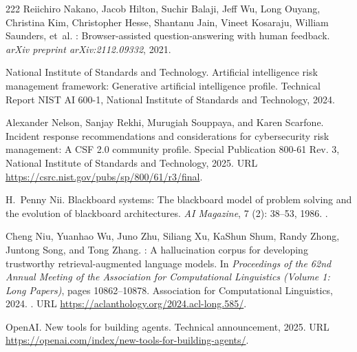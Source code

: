 \begin{thebibliography}{222}
Reiichiro Nakano, Jacob Hilton, Suchir Balaji, Jeff Wu, Long Ouyang, Christina
  Kim, Christopher Hesse, Shantanu Jain, Vineet Kosaraju, William Saunders,
  et~al.
: Browser-assisted question-answering with human feedback.
\newblock \emph{arXiv preprint arXiv:2112.09332}, 2021.

{National Institute of Standards and Technology}.
\newblock Artificial intelligence risk management framework: Generative
  artificial intelligence profile.
\newblock Technical Report NIST AI 600-1, National Institute of Standards and
  Technology, 2024.

Alexander Nelson, Sanjay Rekhi, Murugiah Souppaya, and Karen Scarfone.
\newblock Incident response recommendations and considerations for
  cybersecurity risk management: A {CSF} 2.0 community profile.
\newblock Special Publication 800-61 Rev. 3, National Institute of Standards
  and Technology, 2025.
\newblock URL \url{https://csrc.nist.gov/pubs/sp/800/61/r3/final}.

H.~Penny Nii.
\newblock Blackboard systems: The blackboard model of problem solving and the
  evolution of blackboard architectures.
\newblock \emph{AI Magazine}, 7 (2): 38--53, 1986.
\newblock {}.

Cheng Niu, Yuanhao Wu, Juno Zhu, Siliang Xu, KaShun Shum, Randy Zhong, Juntong
  Song, and Tong Zhang.
: A hallucination corpus for developing trustworthy
  retrieval-augmented language models.
\newblock In \emph{Proceedings of the 62nd Annual Meeting of the Association
  for Computational Linguistics (Volume 1: Long Papers)}, pages 10862--10878.
  Association for Computational Linguistics, 2024.
\newblock {}.
\newblock URL \url{https://aclanthology.org/2024.acl-long.585/}.

{OpenAI}.
\newblock New tools for building agents.
\newblock Technical announcement, 2025.
\newblock URL \url{https://openai.com/index/new-tools-for-building-agents/}.


\end{thebibliography}

